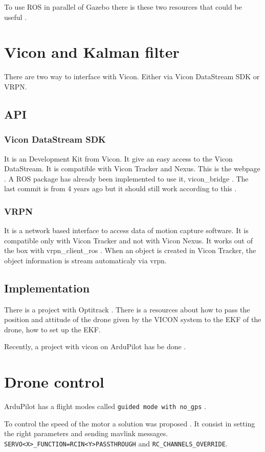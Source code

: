 To use ROS in parallel of Gazebo there is these two resources that could be useful \cite{youtube_gazebo_ros} \cite{github_gazebo_ros}.



\section{Vicon and Kalman filter}
There are two way to interface with Vicon. Either via Vicon DataStream SDK or VRPN.

\subsection{API}
\subsubsection{Vicon DataStream SDK}
It is an Development Kit from Vicon. It give an easy access to the Vicon DataStream. It is compatible with Vicon Tracker and Nexus. This is the webpage \cite{vicon_sdk}. A ROS package has already been implemented to use it, vicon\_bridge \cite{github_vicon_bridge}.
The last commit is from 4 years ago but it should still work according to this \cite{ros_packages_for_vicon}.

\subsubsection{VRPN}
It is a network based interface to access data of motion capture software. It is compatible only with Vicon Tracker and not with Vicon Nexus. It works out of the box with vrpn\_client\_ros \cite{ros_vrpn_client_ros}. When an object is created in Vicon Tracker, the object information is stream automaticaly via vrpn.

\subsection{Implementation}
There is a project with Optitrack \cite{ardupilot_optitrack}. There is a resources about how to pass the position and attitude of the drone given by the VICON system to the EKF of the drone, how to set up the EKF.

Recently, a project with vicon on ArduPilot has be done \cite{ardupilot_vicon}.

\section{Drone control}
ArduPilot has a flight modes called \texttt{guided mode with no\_gps} \cite{ardupilot_flight_modes}.

To control the speed of the motor a solution was proposed \cite{github_ardupilot_11859}.
It consist in setting the right parameters and sending mavlink messages.
\texttt{SERVO<X>\_FUNCTION=RCIN<Y>PASSTHROUGH} and \texttt{RC\_CHANNELS\_OVERRIDE}.
